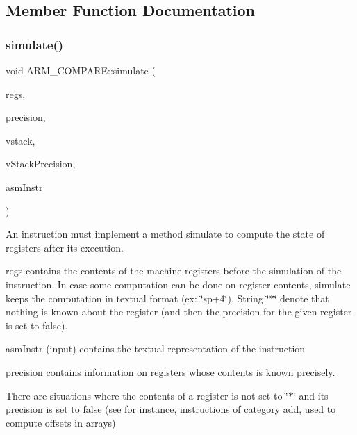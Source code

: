 \subsection{Member Function Documentation}
\mbox{\label{classARM__COMPARE_ae9edd15b40befea710d1de4be1bbeecb}} 
\subsubsection{\texorpdfstring{simulate()}{simulate()}}
{\footnotesize\ttfamily void A\+R\+M\+\_\+\+C\+O\+M\+P\+A\+R\+E\+::simulate (\begin{DoxyParamCaption}\item[{\hyperlink{DAAInstruction_8h_af0fae93a861de9cf37988d5673cac523}{reg\+Table} \&}]{regs,  }\item[{\hyperlink{DAAInstruction_8h_a0e8cae02815a5f8adc750122d790b455}{reg\+Precision\+Table} \&}]{precision,  }\item[{\hyperlink{DAAInstruction_8h_a1b0e70ac1a04f06c8132055ed01f589f}{stack\+Type} \&}]{vstack,  }\item[{\hyperlink{DAAInstruction_8h_ac5cb793e9dac3fa9693da78b7e29ab30}{stack\+Prec\+Type} \&}]{v\+Stack\+Precision,  }\item[{const string \&}]{asm\+Instr }\end{DoxyParamCaption})\hspace{0.3cm}{\ttfamily [virtual]}}

An instruction must implement a method simulate to compute the state of registers after its execution.

regs contains the contents of the machine registers before the simulation of the instruction. In case some computation can be done on register contents, simulate keeps the computation in textual format (ex\+: \char`\"{}sp+4\char`\"{}). String \char`\"{}$\ast$\char`\"{} denote that nothing is known about the register (and then the precision for the given register is set to false).

asm\+Instr (input) contains the textual representation of the instruction

precision contains information on registers whose contents is known precisely.

There are situations where the contents of a register is not set to \char`\"{}$\ast$\char`\"{} and its precision is set to false (see for instance, instructions of category add, used to compute offsets in arrays)

